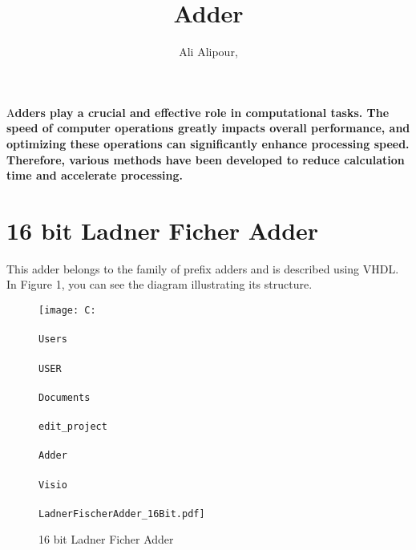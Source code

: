 \documentclass[DIV=calc, paper=a4, fontsize=11pt, twocolumn]{scrartcl}	 %
\title{Adder} %
\author{Ali Alipour, } %
\date{} %
\newcommand{\initial}[1]{ %
\lettrine[lines=3,lhang=0.3,nindent=0em]{
\color{DarkGoldenrod}
{\textsf{#1}}}{}}
\begin{document}
\maketitle %

\thispagestyle{fancy} %


\initial{A}\textbf{dders play a crucial and effective role in computational tasks. The speed of computer operations greatly impacts overall performance, and optimizing these operations can significantly enhance processing speed. Therefore, various methods have been developed to reduce calculation time and accelerate processing.}


\section*{16 bit Ladner Ficher Adder}


This adder belongs to the family of prefix adders and is described using VHDL. 
In Figure 1, you can see the diagram illustrating its structure.


\begin{figure}[htbp]
  \centering
  \texttt{[image: C:\\\\Users\\\\USER\\\\Documents\\\\edit\_project\\\\Adder\\\\Visio\\\\LadnerFischerAdder\_16Bit.pdf]}
  \caption{16 bit Ladner Ficher Adder}
  \label{fig:visio-diagram}
\end{figure}

\end{document}
